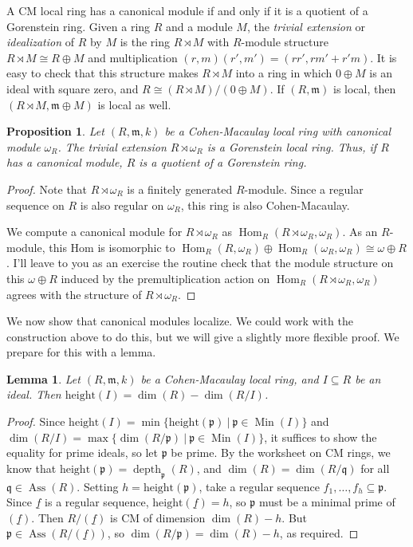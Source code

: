 \documentclass[11pt]{book}
\newtheorem{lemma}[theorem]{Lemma}
\newtheorem{proposition}[theorem]{Proposition}
\numberwithin{equation}{section}
\numberwithin{theorem}{chapter}
\theoremstyle{definition}
\newtheorem*{basic properties}{Basic Properties}
\newtheorem*{Important Remark}{Important Remark}
\theoremstyle{remark}
\newcommand{\m}{\mathfrak{m}}
\newcommand{\p}{\mathfrak{p}}
\newcommand{\q}{\mathfrak{q}}
\newcommand{\Hom}{\operatorname{Hom}}
\newcommand{\Ass}{\operatorname{Ass}}
\newcommand{\Min}{\operatorname{Min}}
\renewcommand{\dim}{\operatorname{dim}}
\newcommand{\depth}{\operatorname{depth}}
\begin{document}
A CM local ring has a canonical module if and only if it is a quotient of a Gorenstein ring. Given a ring $R$ and a module $M$, the \emph{trivial extension} or \emph{idealization} of $R$ by $M$ is the ring $R \rtimes M$ with $R$-module structure $R \rtimes M\cong R \oplus M$ and multiplication $(r,m)(r',m')=(rr',rm'+r'm)$. It is easy to check that this structure makes $R\rtimes M$ into a ring in which $0\oplus M$ is an ideal with square zero, and $R\cong (R\rtimes M) / (0\oplus M)$. If $(R,\m)$ is local, then $(R\rtimes M, \m \oplus M)$ is local as well.

\begin{proposition} Let $(R,\m,k)$ be a Cohen-Macaulay local ring with canonical module $\omega_R$. The trivial extension $R\rtimes \omega_R$ is a Gorenstein local ring. Thus, if $R$ has a canonical module, $R$ is a quotient of a Gorenstein ring.
\end{proposition}
\begin{proof}
	Note that $R\rtimes \omega_R$ is a finitely generated $R$-module. Since a regular sequence on $R$ is also regular on $\omega_R$, this ring is also Cohen-Macaulay.
	
	We compute a canonical module for $R\rtimes \omega_R$ as $\Hom_R(R\rtimes \omega_R,\omega_R)$. As an $R$-module, this Hom is isomorphic to $\Hom_R(R,\omega_R) \oplus \Hom_R(\omega_R,\omega_R)\cong \omega\oplus R$. I'll leave to you as an exercise the routine check that the module structure on this $\omega \oplus R$ induced by the premultiplication action on $\Hom_R(R\rtimes \omega_R,\omega_R)$ agrees with the structure of $R\rtimes \omega_R$.
\end{proof}

We now show that canonical modules localize. We could work with the construction above to do this, but we will give a slightly more flexible proof. We prepare for this with a lemma.

\begin{lemma}
	Let $(R,\m,k)$ be a Cohen-Macaulay local ring, and $I\subseteq R$ be an ideal. Then $\mathrm{height}(I)=\dim(R)-\dim(R/I)$.
\end{lemma}
\begin{proof}
	Since $\mathrm{height}(I)=\min\{ \mathrm{height}(\p) \ | \ \p\in \Min(I) \}$ and $\dim(R/I)=\max\{ \dim(R/\p) \ | \ \p \in \Min(I) \}$, it suffices to show the equality for prime ideals, so let $\p$ be prime. By the worksheet on CM rings, we know that $\mathrm{height}(\p) = \depth_{\p}(R)$, and
	 $\dim(R)=\dim(R/\q)$ for all $\q\in \Ass(R)$. 
Setting $h=\mathrm{height}(\p)$, take a regular sequence $f_1,\dots,f_h\subseteq \p$. Since $\underline{f}$ is a regular sequence, $\mathrm{height}(\underline{f})=h$, so $\p$ must be a minimal prime of $(\underline{f})$. Then $R/(\underline{f})$ is CM of dimension $\dim(R)-h$. But $\p\in \Ass(R/(\underline{f}))$, so $\dim(R/\p)=\dim(R)-h$, as required.
\end{proof}
\end{document}
